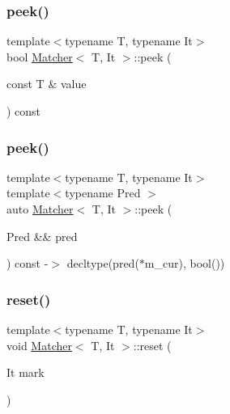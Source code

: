 \mbox{\label{class_matcher_a28b154cbc4cb7ae203810043e069ae38}} 
\subsubsection{\texorpdfstring{peek()}{peek()}\hspace{0.1cm}{\footnotesize\ttfamily [1/2]}}
{\footnotesize\ttfamily template$<$typename T, typename It$>$ \\
bool \hyperlink{class_matcher}{Matcher}$<$ T, It $>$\+::peek (\begin{DoxyParamCaption}\item[{const T \&}]{value }\end{DoxyParamCaption}) const\hspace{0.3cm}{\ttfamily [inline]}}

\mbox{\label{class_matcher_a4c92e3958c64eee29812f4ed75c331cf}} 
\subsubsection{\texorpdfstring{peek()}{peek()}\hspace{0.1cm}{\footnotesize\ttfamily [2/2]}}
{\footnotesize\ttfamily template$<$typename T, typename It$>$ \\
template$<$typename Pred $>$ \\
auto \hyperlink{class_matcher}{Matcher}$<$ T, It $>$\+::peek (\begin{DoxyParamCaption}\item[{Pred \&\&}]{pred }\end{DoxyParamCaption}) const -\/$>$ decltype(pred($\ast$m\+\_\+cur), bool())
  \hspace{0.3cm}{\ttfamily [inline]}}

\mbox{\label{class_matcher_abb67aa2acac25b34d80ffb2e64eef44c}} 
\subsubsection{\texorpdfstring{reset()}{reset()}\hspace{0.1cm}{\footnotesize\ttfamily [1/2]}}
{\footnotesize\ttfamily template$<$typename T, typename It$>$ \\
void \hyperlink{class_matcher}{Matcher}$<$ T, It $>$\+::reset (\begin{DoxyParamCaption}\item[{It}]{mark }\end{DoxyParamCaption})\hspace{0.3cm}{\ttfamily [inline]}}

